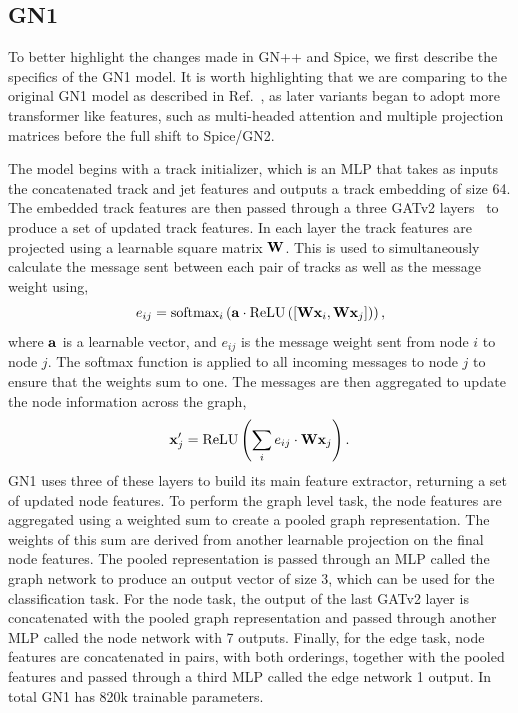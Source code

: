 \subsection{GN1}

To better highlight the changes made in GN++ and Spice, we first describe the specifics of the GN1 model.
It is worth highlighting that we are comparing to the original GN1 model as described in Ref.~\cite{GN1}, as later variants began to adopt more transformer like features, such as multi-headed attention and multiple projection matrices before the full shift to Spice/GN2.

The model begins with a track initializer, which is an MLP that takes as inputs the concatenated track and jet features and outputs a track embedding of size 64.
The embedded track features are then passed through a three GATv2 layers~\cite{GATv2} to produce a set of updated track features.
In each layer the track features are projected using a learnable square matrix $\mathbf{W}$.
This is used to simultaneously calculate the message sent between each pair of tracks as well as the message weight using,
\begin{equation}
    e_{ij} = \text{softmax}_i\left(\mathbf{a} \cdot \text{ReLU}\left([\mathbf{W} \mathbf{x}_i, \mathbf{W} \mathbf{x}_j]\right)\right),
\end{equation}
where $\mathbf{a}$ is a learnable vector, and $e_{ij}$ is the message weight sent from node $i$ to node $j$.
The softmax function is applied to all incoming messages to node $j$ to ensure that the weights sum to one.
The messages are then aggregated to update the node information across the graph,
\begin{equation}
    \mathbf{x}_j' = \text{ReLU}\left(\sum_{i} e_{ij} \cdot \mathbf{W} \mathbf{x}_j\right).
\end{equation}
GN1 uses three of these layers to build its main feature extractor, returning a set of updated node features.
To perform the graph level task, the node features are aggregated using a weighted sum to create a pooled graph representation.
The weights of this sum are derived from another learnable projection on the final node features.
The pooled representation is passed through an MLP called the graph network to produce an output vector of size 3, which can be used for the classification task.
For the node task, the output of the last GATv2 layer is concatenated with the pooled graph representation and passed through another MLP called the node network with 7 outputs.
Finally, for the edge task, node features are concatenated in pairs, with both orderings, together with the pooled features and passed through a third MLP called the edge network 1 output.
In total GN1 has 820k trainable parameters.

